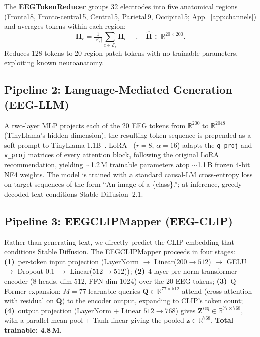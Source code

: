 \documentclass{article}
\begin{document}
The \textbf{EEGTokenReducer} groups 32 electrodes into five anatomical regions (Frontal\,8, Fronto-central\,5, Central\,5, Parietal\,9, Occipital\,5; App.~\ref{app:channels}) and averages tokens within each region:
\begin{equation}
  \hat{\mathbf{H}}_r = \tfrac{1}{|\mathcal{E}_r|} \textstyle\sum_{c\in\mathcal{E}_r} \mathbf{H}_{c,:,:},
  \quad \hat{\mathbf{H}}\in\mathbb{R}^{20\times 200}.
\end{equation}
Reduces 128 tokens to 20 region-patch tokens with no trainable parameters, exploiting known neuroanatomy.

\subsection{Pipeline 2: Language-Mediated Generation (EEG-LLM)}

A two-layer MLP projects each of the 20 EEG tokens from $\mathbb{R}^{200}$ to $\mathbb{R}^{2048}$ (TinyLlama's hidden dimension); the resulting token sequence is prepended as a soft prompt to TinyLlama-1.1B~\citep{zhang2024tinyllama}. LoRA~\citep{hu2022lora} ($r{=}8,\,\alpha{=}16$) adapts the \texttt{q\_proj} and \texttt{v\_proj} matrices of every attention block, following the original LoRA recommendation, yielding $\sim$1.2\,M trainable parameters atop $\sim$1.1\,B frozen 4-bit NF4 weights. The model is trained with a standard causal-LM cross-entropy loss on target sequences of the form ``An image of a \{class\}.''; at inference, greedy-decoded text conditions Stable Diffusion~2.1.

\subsection{Pipeline 3: EEGCLIPMapper (EEG-CLIP)}
\label{sec:p3}

Rather than generating text, we directly predict the CLIP embedding that conditions Stable Diffusion. The EEGCLIPMapper proceeds in four stages: \textbf{(1)}~per-token input projection (LayerNorm $\to$ Linear($200{\to}512$) $\to$ GELU $\to$ Dropout 0.1 $\to$ Linear($512{\to}512$)); \textbf{(2)}~4-layer pre-norm transformer encoder (8 heads, dim 512, FFN dim 1024) over the 20 EEG tokens; \textbf{(3)}~Q-Former expansion: $M{=}77$ learnable queries $\mathbf{Q}\in\mathbb{R}^{77\times 512}$ attend (cross-attention with residual on $\mathbf{Q}$) to the encoder output, expanding to CLIP's token count; \textbf{(4)}~output projection (LayerNorm + Linear $512{\to}768$) gives $\mathbf{Z}^{\text{seq}}\in\mathbb{R}^{77\times 768}$, with a parallel mean-pool + Tanh-linear giving the pooled $\bar{\mathbf{z}}\in\mathbb{R}^{768}$. \textbf{Total trainable: 4.8\,M.}
\end{document}
